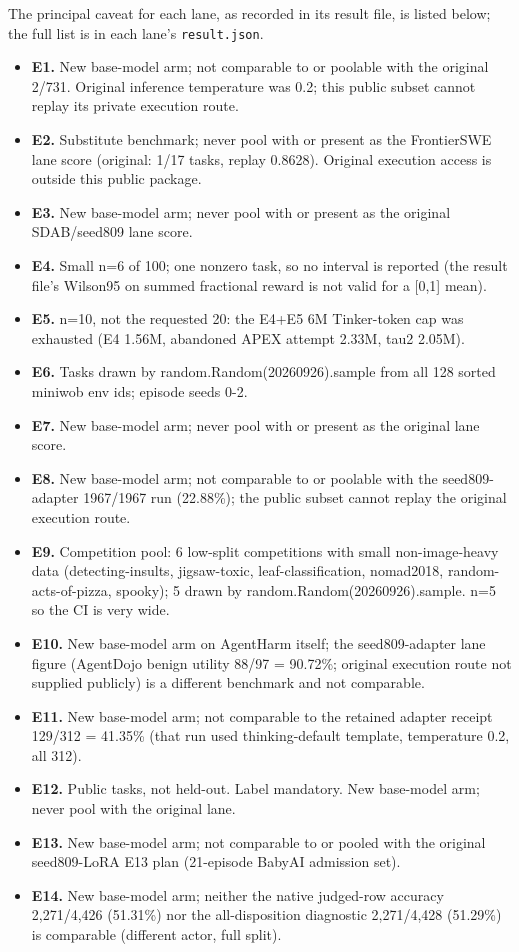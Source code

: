 \documentclass[12pt,a4paper]{report}
\providecommand{\tightlist}{%
  \setlength{\itemsep}{0pt}\setlength{\parskip}{0pt}}
\begin{document}
The principal caveat for each lane, as recorded in its result file, is
listed below; the full list is in each lane's \texttt{result.json}.

\begin{itemize}
\tightlist
\item
  \textbf{E1.} New base-model arm; not comparable to or poolable with
  the original 2/731. Original inference temperature was 0.2; this
  public subset cannot replay its private execution route.
\item
  \textbf{E2.} Substitute benchmark; never pool with or present as the
  FrontierSWE lane score (original: 1/17 tasks, replay 0.8628). Original
  execution access is outside this public package.
\item
  \textbf{E3.} New base-model arm; never pool with or present as the
  original SDAB/seed809 lane score.
\item
  \textbf{E4.} Small n=6 of 100; one nonzero task, so no interval is
  reported (the result file's Wilson95 on summed fractional reward is
  not valid for a {[}0,1{]} mean).
\item
  \textbf{E5.} n=10, not the requested 20: the E4+E5 6M Tinker-token cap
  was exhausted (E4 1.56M, abandoned APEX attempt 2.33M, tau2 2.05M).
\item
  \textbf{E6.} Tasks drawn by random.Random(20260926).sample from all
  128 sorted miniwob env ids; episode seeds 0-2.
\item
  \textbf{E7.} New base-model arm; never pool with or present as the
  original lane score.
\item
  \textbf{E8.} New base-model arm; not comparable to or poolable with
  the seed809-adapter 1967/1967 run (22.88\%); the public subset cannot
  replay the original execution route.
\item
  \textbf{E9.} Competition pool: 6 low-split competitions with small
  non-image-heavy data (detecting-insults, jigsaw-toxic,
  leaf-classification, nomad2018, random-acts-of-pizza, spooky); 5 drawn
  by random.Random(20260926).sample. n=5 so the CI is very wide.
\item
  \textbf{E10.} New base-model arm on AgentHarm itself; the
  seed809-adapter lane figure (AgentDojo benign utility 88/97 = 90.72\%;
  original execution route not supplied publicly) is a different
  benchmark and not comparable.
\item
  \textbf{E11.} New base-model arm; not comparable to the retained
  adapter receipt 129/312 = 41.35\% (that run used thinking-default
  template, temperature 0.2, all 312).
\item
  \textbf{E12.} Public tasks, not held-out. Label mandatory. New
  base-model arm; never pool with the original lane.
\item
  \textbf{E13.} New base-model arm; not comparable to or pooled with the
  original seed809-LoRA E13 plan (21-episode BabyAI admission set).
\item
  \textbf{E14.} New base-model arm; neither the native judged-row
  accuracy 2,271/4,426 (51.31\%) nor the all-disposition diagnostic
  2,271/4,428 (51.29\%) is comparable (different actor, full split).
\end{itemize}
\end{document}
